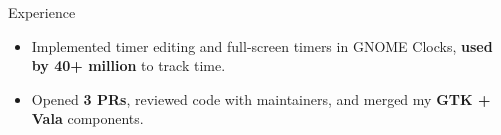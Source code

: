 \documentclass{resume} %
\begin{document}
\begin{workSection}{Experience}
\begin{itemize}
		\item Implemented timer editing and full-screen timers in GNOME Clocks, \textbf{used by 40+ million} to track time.
		\item Opened \textbf{3 PRs}, reviewed code with maintainers, and merged my \textbf{GTK + Vala} components.
	\end{itemize}
	

\end{workSection}
\end{document}
